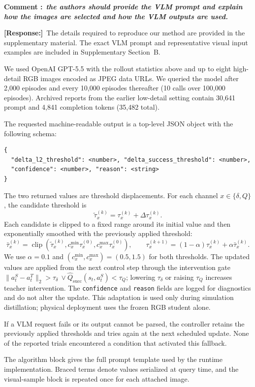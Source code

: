 \documentclass[12pt]{article}
\newcommand{\response}{\par\smallskip\noindent\textbf{[Response:]}\ }
\newcounter{reviewcomment}
\newcommand{\reviewcomment}[1]{%
  \refstepcounter{reviewcomment}
  \par\smallskip\noindent\textbf{Comment \thereviewcomment:}\
  \textbf{\itshape #1}\par
}
\begin{document}
\reviewcomment{the authors should provide the VLM prompt and explain how the
images are selected and how the VLM outputs are used.}

\response The details required to reproduce our method are provided
in the supplementary material. The exact VLM prompt and representative visual
input examples are included in Supplementary Section~B.

We used OpenAI GPT-5.5 with the rollout statistics above and up to eight
high-detail RGB images encoded as JPEG data URLs. We queried the model after
2{,}000 episodes and every 10{,}000 episodes thereafter (10 calls over 100{,}000
episodes). Archived reports from the earlier low-detail setting contain 30{,}641
prompt and 4{,}841 completion tokens (35{,}482 total).

\begingroup\footnotesize
The requested machine-readable output is a top-level JSON object with the
following schema:
\begin{verbatim}
{
  "delta_l2_threshold": <number>, "delta_success_threshold": <number>,
  "confidence": <number>, "reason": <string>
}
\end{verbatim}
\endgroup
The two returned values are threshold displacements. For each channel
$x\in\{\delta,Q\}$, the candidate threshold is
\[
\tilde\tau_x^{(k)}=\tau_x^{(k)}+\Delta\tau_x^{(k)}.
\]
Each candidate is clipped to a fixed range around its initial value and then
exponentially smoothed with the previously applied threshold:
\[
\bar\tau_x^{(k)}=\operatorname{clip}\!\left(
\tilde\tau_x^{(k)},c_x^{\min}\tau_x^{(0)},
c_x^{\max}\tau_x^{(0)}\right),\qquad
\tau_x^{(k+1)}=(1-\alpha)\tau_x^{(k)}+\alpha\bar\tau_x^{(k)}.
\]
We use $\alpha=0.1$ and $(c_x^{\min},c_x^{\max})=(0.5,1.5)$ for both
thresholds. The updated values are applied from the next control step through
the intervention gate
$\lVert a_t^S-a_t^T\rVert_2>\tau_\delta\ \lor
\hat Q_{\mathrm{succ}}(s_t,a_t^S)<\tau_Q$; lowering $\tau_\delta$ or raising
$\tau_Q$ increases teacher intervention. The \texttt{confidence} and
\texttt{reason} fields are logged for diagnostics and do not alter the update.
This adaptation is used only during simulation distillation; physical
deployment uses the frozen RGB student alone.

If a VLM request fails or its output cannot be parsed, the controller retains
the previously applied thresholds and tries again at the next scheduled update.
None of the reported trials encountered a condition that activated this
fallback.

The algorithm block gives the full prompt template used by the runtime
implementation. Braced terms denote values serialized at query time, and the
visual-sample block is repeated once for each attached image.
\end{document}
